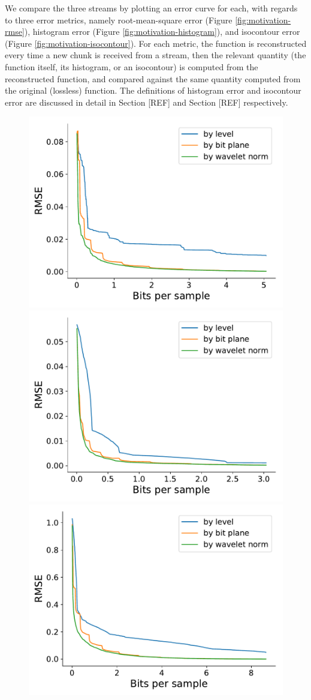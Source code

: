 We compare the three streams by plotting an error curve for each, with regards to three error
metrics, namely root-mean-square error (Figure \ref{fig:motivation-rmse}), histogram error (Figure
\ref{fig:motivation-histogram}), and isocontour error (Figure \ref{fig:motivation-isocontour}). For
each metric, the function is reconstructed every time a new chunk is received from a stream, then
the relevant quantity (the function itself, its histogram, or an isocontour) is computed from the
reconstructed function, and compared against the same quantity computed from the original (lossless)
function. The definitions of histogram error and isocontour error are discussed in detail in Section
[REF] and Section [REF] respectively.

\begin{figure}
  \centering
  {\includegraphics[width=0.48\linewidth]{img/motivation/motivation-psnr-boiler.pdf}}
 	{\includegraphics[width=0.48\linewidth]{img/motivation/motivation-psnr-diffusivity.pdf}}
 	{\includegraphics[width=0.48\linewidth]{img/motivation/motivation-psnr-plasma.pdf}}

\end{figure}
